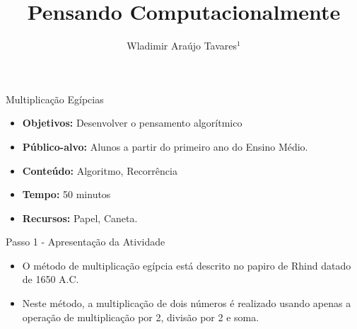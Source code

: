 \documentclass{beamer}
\title {Pensando Computacionalmente}
\author[Wladimir Araújo Tavares]{ Wladimir Araújo Tavares$^{1}$  }
\institute[UFC]{$^{1}$Universidade Federal do Ceará - Campus de Quixadá\\}
\date{}
\begin{document}
\begin{frame}
	\titlepage
\end{frame}




\begin{frame}{Multiplicação Egípcias}

\begin{itemize}
\item \textbf{Objetivos:} Desenvolver o pensamento algorítmico

\item \textbf{Público-alvo:}  Alunos a partir do primeiro ano do Ensino Médio.

\item \textbf{Conteúdo:} Algoritmo, Recorrência

\item \textbf{Tempo:} 50 minutos

\item \textbf{Recursos:} Papel, Caneta.

\end{itemize}
    
\end{frame}


\begin{frame}{Passo 1 - Apresentação da Atividade}

\begin{itemize}
   
\item <1-> O método de multiplicação egípcia está descrito no papiro de Rhind datado de 1650 A.C. 

\item Neste método, a multiplicação de dois números é realizado usando apenas a operação de multiplicação por 2, divisão por 2 e soma.



\end{itemize}

\end{frame}
\end{document}
